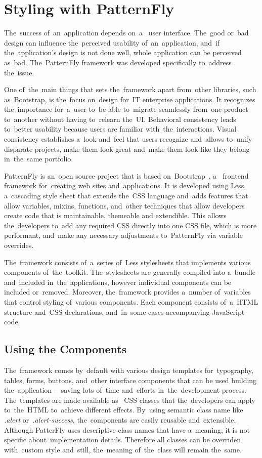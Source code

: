 \section{Styling with PatternFly}
The~success of~an~application depends on~a~ user interface.
The~good or~bad design can influence the~perceived usability of~an~application,
and~if the~application's design is not done well, whole application can be
perceived as~bad. The~PatternFly framework was developed specifically to~address
the~issue.

One of~the~main things that sets the~framework apart from~other libraries, such
as~Bootstrap, is the~focus on~design for~IT enterprise applications. It
recognizes the~importance for~a~user to~be able to~migrate seamlessly from~one
product to~another without having to~relearn the~UI. Behavioral consistency
leads to~better usability because users are familiar with~the~interactions.
Visual consistency establishes a~look and~feel that users recognize and~allows
to~unify disparate projects, make them look great and~make them look like they
belong in~the~same portfolio.

PatternFly is an~open source project that is based
on~Bootstrap~\cite{Bootstrap}, a~ frontend framework
for~creating web sites and~applications. It is developed using Less, a~cascading
style sheet  that extends the~CSS language and~adds features
that allow variables, mixins, functions, and~other techniques that allow
developers create code that is maintainable, themeable and extendible. This
allows the~developers to~add any required  CSS directly into
one CSS file, which is more performant, and~make any necessary adjustments
to~PatternFly via variable overrides.

The~framework consists of~a~series of~Less stylesheets that implements various
components of~the~toolkit. The~stylesheets are generally compiled into a~bundle
and~included in~the~applications, however individual components can be included
or~removed. Moreover, the~framework provides a~number of~variables that control
styling of~various components. Each component consists of~a~HTML structure
and~CSS declarations, and~in~some cases accompanying JavaScript code.


\subsection{Using the Components}
The~framework comes by~default with various design templates for~typography,
tables, forms, buttons, and~other interface components that can be used building
the~application --~saving lots of~time and~efforts in~the~development process.
The~templates are made available as~ CSS classes that
the~developers can apply to~the~HTML to~achieve different effects. By~using
semantic class name like \textit{.alert} or~\textit{.alert-success},
the~components are easily reusable and~extensible. Although PatterFly uses
descriptive class names that have a~meaning, it is not specific
about~implementation details. Therefore all classes can be overriden with~custom
style and~still, the~meaning of~the~class will remain the~same.

